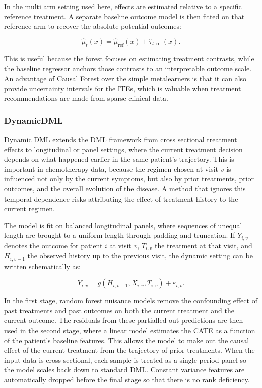 \documentclass{article}
\begin{document}
In the multi arm setting used here, effects are estimated relative to a specific reference treatment. A separate baseline outcome model is then fitted on that reference arm to recover the absolute potential outcomes:

\begin{equation}
    \hat{\mu}_t(x) = \hat{\mu}_{\mathrm{ref}}(x) + \hat{\tau}_{t,\mathrm{ref}}(x).
\end{equation}

This is useful because the forest focuses on estimating treatment contrasts, while the baseline regressor anchors those contrasts to an interpretable outcome scale. An advantage of Causal Forest over the simple metalearners is that it can also provide uncertainty intervals for the ITEs, which is valuable when treatment recommendations are made from sparse clinical data.

\subsubsection*{DynamicDML}

Dynamic DML extends the DML framework from cross sectional treatment effects to longitudinal or panel settings, where the current treatment decision depends on what happened earlier in the same patient's trajectory. This is important in chemotherapy data, because the regimen chosen at visit $v$ is influenced not only by the current symptoms, but also by prior treatments, prior outcomes, and the overall evolution of the disease. A method that ignores this temporal dependence risks attributing the effect of treatment history to the current regimen.

The model is fit on balanced longitudinal panels, where sequences of unequal length are brought to a uniform length through padding and truncation. If $Y_{i,v}$ denotes the outcome for patient $i$ at visit $v$, $T_{i,v}$ the treatment at that visit, and $H_{i,v-1}$ the observed history up to the previous visit, the dynamic setting can be written schematically as:

\begin{equation}
    Y_{i,v} = g(H_{i,v-1}, X_{i,v}, T_{i,v}) + \varepsilon_{i,v}.
\end{equation}

In the first stage, random forest nuisance models remove the confounding effect of past treatments and past outcomes on both the current treatment and the current outcome. The residuals from these partialled-out predictions are then used in the second stage, where a linear model estimates the CATE as a function of the patient's baseline features. This allows the model to make out the causal effect of the current treatment from the trajectory of prior treatments. When the input data is cross-sectional, each sample is treated as a single period panel so the model scales back down to standard DML. Constant variance features are automatically dropped before the final stage so that there is no rank deficiency.
\end{document}
